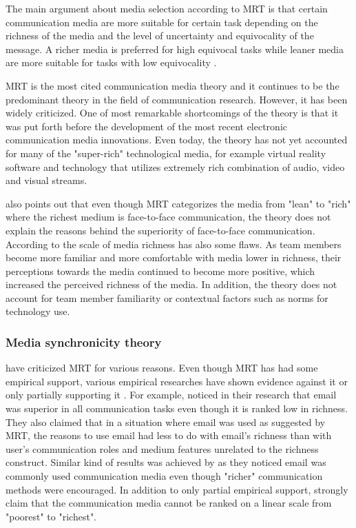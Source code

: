 \documentclass[english,12pt,a4paper,pdftex]{article}
\begin{document}
The main argument about media selection according to \ac{MRT} is that certain communication media are more suitable for certain task depending on the richness of the media and the level of uncertainty and equivocality of the message. A richer media is preferred for high equivocal tasks while leaner media are more suitable for tasks with low equivocality \citep{daft1987}.

\Ac{MRT} is the most cited communication media theory and it continues to be the predominant theory in the field of communication research. However, it has been widely criticized. One of most remarkable shortcomings of the theory is that it was put forth before the development of the most recent electronic communication media innovations. Even today, the theory has not yet accounted for many of the "super-rich" technological media, for example virtual reality software and technology that utilizes extremely rich combination of audio, video and visual streams. \citep{derosa2004}

\citet{derosa2004} also points out that even though \ac{MRT} categorizes the media from "lean" to "rich" where the richest medium is face-to-face communication, the theory does not explain the reasons behind the superiority of face-to-face communication. According to \citet{derosa2004} the scale of media richness has also some flaws. As team members become more familiar and more comfortable with media lower in richness, their perceptions towards the media continued to become more positive, which increased the perceived richness of the media. In addition, the theory does not account for team member familiarity or contextual factors such as norms for technology use.

\subsubsection{Media synchronicity theory}
\label{sec:media_synchronicity_theory}

\citet{dennis1999} have criticized \ac{MRT} for various reasons. Even though \ac{MRT} has had some empirical support, various empirical researches have shown evidence against it or only partially supporting it \citep{dennis1998} \citep{elshinnawy1997}. For example, \citet{elshinnawy1997} noticed in their research that email was superior in all communication tasks even though it is ranked low in richness. They also claimed that in a situation where email was used as suggested by \ac{MRT}, the reasons to use email had less to do with email's richness than with user's communication roles and medium features unrelated to the richness construct. Similar kind of results was achieved by \citet{korkala2006} as they noticed email was commonly used communication media even though "richer" communication methods were encouraged. In addition to only partial empirical support, \citet{dennis1999} strongly claim that the communication media cannot be ranked on a linear scale from "poorest" to "richest".
\end{document}
